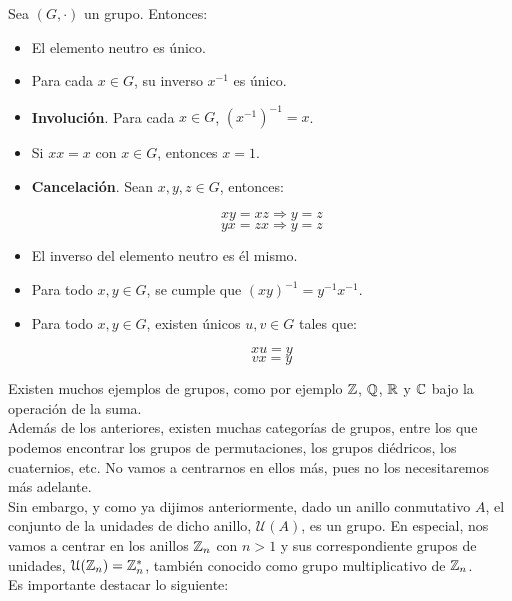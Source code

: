 \begin{proposicion}
	Sea $(G, \cdot)$ un grupo. Entonces:
	
	\begin{itemize}
		\item El elemento neutro es único.
		
		\item Para cada $x \in G$, su inverso $x^{-1}$ es único.
		
		\item \textbf{Involución}. Para cada $x \in G$, $(x^{-1})^{-1} = x$.
		
		\item Si $xx = x$ con $x \in G$, entonces $x = 1$.
		
		\item \textbf{Cancelación}. Sean $x, y, z \in G$, entonces:
		
		\[ xy = xz \Rightarrow y = z \]
		\[ yx = zx \Rightarrow y = z \]
		
		\item El inverso del elemento neutro es él mismo.
		
		\item Para todo $x, y \in G$, se cumple que $(xy)^{-1} = y^{-1}x^{-1}$.
		
		\item Para todo $x, y \in G$, existen únicos $u, v \in G$ tales que:
		
		\[ xu = y \]
		\[ vx = y \]
	\end{itemize}
\end{proposicion}

Existen muchos ejemplos de grupos, como por ejemplo $\mathbb{Z}$, $\mathbb{Q}$, $\mathbb{R}$ y $\mathbb{C}$ bajo la operación de la suma.\\

Además de los anteriores, existen muchas categorías de grupos, entre los que podemos encontrar los grupos de permutaciones, los grupos diédricos, los cuaternios, etc. No vamos a centrarnos en ellos más, pues no los necesitaremos más adelante.\\

Sin embargo, y como ya dijimos anteriormente, dado un anillo conmutativo $A$, el conjunto de la unidades de dicho anillo, $\mathcal{U}(A)$, es un grupo. En especial, nos vamos a centrar en los anillos $\mathbb{Z}_n$ con $n > 1$ y sus correspondiente grupos de unidades, $\mathcal{U}(\mathbb{Z}_n) = \mathbb{Z}_n^*$, también conocido como grupo multiplicativo de $\mathbb{Z}_n$.\\

Es importante destacar lo siguiente:

